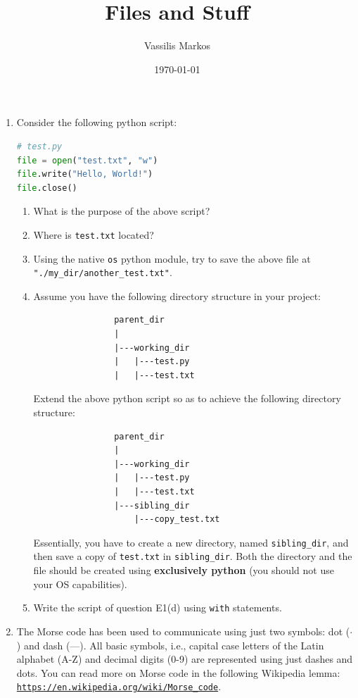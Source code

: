 \documentclass[a4paper, 11pt]{article}
\title{Files and Stuff}
\author{Vassilis Markos}
\date{\today}
\theoremstyle{definition}
\begin{document}
	\maketitle
	
	\begin{enumerate}[label = E\arabic*.]
		\item Consider the following python script:
		\begin{lstlisting}[language=Python]
# test.py
file = open("test.txt", "w")
file.write("Hello, World!")
file.close()
		\end{lstlisting}
		\begin{enumerate}
			\item What is the purpose of the above script?
			\item Where is \texttt{test.txt} located?
			\item Using the native \texttt{os} python module, try to save the above file at \texttt{"./my\_dir/another\_test.txt"}.
			\item Assume you have the following directory structure in your project:
			\begin{verbatim}
				parent_dir
				|
				|---working_dir
				|   |---test.py
				|   |---test.txt
			\end{verbatim}
			Extend the above python script so as to achieve the following directory structure:
			\begin{verbatim}
				parent_dir
				|
				|---working_dir
				|   |---test.py
				|   |---test.txt
				|---sibling_dir
				    |---copy_test.txt
			\end{verbatim}
			Essentially, you have to create a new directory, named \texttt{sibling\_dir}, and then save a copy of \texttt{test.txt} in \texttt{sibling\_dir}. Both the directory and the file should be created using \textbf{exclusively python} (you should not use your OS capabilities).
			\item Write the script of question E1(d) using \texttt{with} statements.
		\end{enumerate}
		\item The Morse code has been used to communicate using just two symbols: dot ($\cdot$) and dash (---). All basic symbols, i.e., capital case letters of the Latin alphabet (A-Z) and decimal digits (0-9) are represented using just dashes and dots. You can read more on Morse code in the following Wikipedia lemma:\\ \href{https://en.wikipedia.org/wiki/Morse_code}{\texttt{https://en.wikipedia.org/wiki/Morse\_code}}.
		\begin{enumerate}

\end{enumerate}
\end{enumerate}
\end{document}

